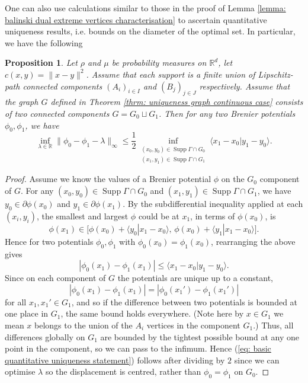 \documentclass[11pt, oneside, titlepage]{book}
\theoremstyle{plain}
\newtheorem{proposition}[theorem]{Proposition}
\theoremstyle{definition}
\newcommand{\R}{\mathbb{R}}
\DeclareMathOperator{\supp}{Supp}
\begin{document}
One can also use calculations similar to those in the proof of Lemma \ref{lemma: balinski dual extreme vertices characterisation} to ascertain quantitative uniqueness results, i.e. bounds on the diameter of the optimal set. In particular, we have the following
\begin{proposition}
    Let $\rho$ and $\mu$ be probability measures on $\R^d$, let $c(x, y) = \|x-y\|^2$. Assume that each support is a finite union of Lipschitz-path connected components $(A_i)_{i \in I}$ and $(B_j)_{j \in J}$ respectively. Assume that the graph $G$ defined in Theorem \ref{thrm: uniqueness graph continuous case} consists of two connected components $G = G_0 \sqcup G_1$. Then for any two Brenier potentials $\phi_0, \phi_1$, we have
    \begin{equation}
    \label{eq: basic quantitative uniqueness statement}
        \inf_{\lambda \in \R} \| \phi_0 - \phi_1 - \lambda\|_{\infty} \leq \frac{1}{2}\inf_{\substack{(x_0, y_0) \in \supp \Gamma \cap G_0\\ (x_1, y_1) \in \supp \Gamma \cap G_1}} \langle x_1 - x_0 | y_1 - y_0 \rangle.
    \end{equation}
\end{proposition}
\begin{proof}
Assume we know the values of a Brenier potential $\phi$ on the $G_0$ component of $G$. For any $(x_0, y_0) \in \supp \Gamma \cap G_0$ and $(x_1, y_1) \in \supp \Gamma \cap G_1$, we have $y_0 \in \partial \phi(x_0)$ and $y_1 \in \partial \phi(x_1)$. By the subdifferential inequality applied at each $(x_i, y_i)$, the smallest and largest $\phi$ could be at $x_1$, in terms of $\phi(x_0)$, is
\begin{equation}
    \phi(x_1) \in \Big[\phi(x_0) + \langle y_0 | x_1 - x_0 \rangle,\, \phi(x_0) + \langle y_1 | x_1 - x_0 \rangle\Big].
\end{equation}
Hence for two potentials $\phi_0, \phi_1$ with $\phi_0(x_0) = \phi_1(x_0)$, rearranging the above gives
\begin{equation*}
    |\phi_0(x_1) - \phi_1(x_1)| \leq \langle x_1 - x_0 | y_1 - y_0 \rangle.
\end{equation*}
Since on each component of $G$ the potentials are unique up to a constant,
\begin{equation*}
    |\phi_0(x_1) - \phi_1(x_1) | = |\phi_0(x_1') - \phi_1(x_1') |
\end{equation*}
for all $x_1, x_1' \in G_1$, and so if the difference between two potentials is bounded at one place in $G_1$, the same bound holds everywhere. (Note here by $x \in G_1$ we mean $x$ belongs to the union of the $A_i$ vertices in the component $G_1$.) Thus, all differences globally on $G_1$ are bounded by the tightest possible bound at any one point in the component, so we can pass to the infimum. Hence (\ref{eq: basic quantitative uniqueness statement}) follows after dividing by $2$ since we can optimise $\lambda$ so the displacement is centred, rather than $\phi_0 = \phi_1$ on $G_0$.
\end{proof}
\end{document}
